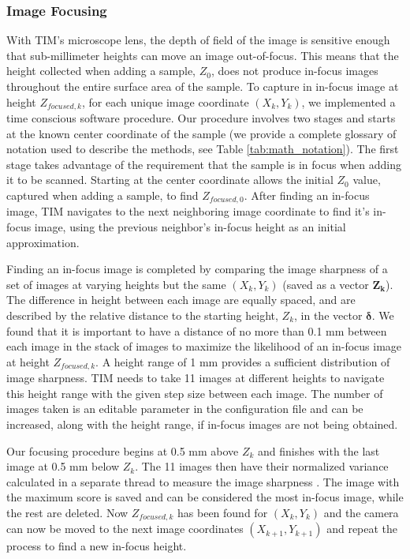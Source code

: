 \documentclass[a4paper,12pt]{article}
\begin{document}
\subsubsection{Image Focusing}

With TIM's microscope lens, the depth of field of the image is sensitive enough that sub-millimeter heights can move an image out-of-focus.
This means that the height collected when adding a sample, $Z_0$, does not produce in-focus images throughout the entire surface area of the sample.
To capture in in-focus image at height $Z_{focused,k}$, for each unique image coordinate $(X_k, Y_k)$, we implemented a time conscious software procedure. 
Our procedure involves two stages and starts at the known center coordinate of the sample (we provide a complete glossary of notation used to describe the methods, see Table \ref{tab:math_notation}).
The first stage takes advantage of the requirement that the sample is in focus when adding it to be scanned.
Starting at the center coordinate allows the initial $Z_0$ value, captured when adding a sample, to find $Z_{focused,0}$. 
After finding an in-focus image, TIM navigates to the next neighboring image coordinate to find it's in-focus image, using the previous neighbor's in-focus height as an initial approximation.

Finding an in-focus image is completed by comparing the image sharpness of a set of images at varying heights but the same $(X_k, Y_k)$ (saved as a vector $\boldsymbol{Z_k}$). 
The difference in height between each image are equally spaced, and are described by the relative distance to the starting height, $Z_k$, in the vector $\boldsymbol{\delta}$. 
We found that it is important to have a distance of no more than 0.1 mm between each image in the stack of images to maximize the likelihood of an in-focus image at height $Z_{focused,k}$.
A height range of 1 mm provides a sufficient distribution of image sharpness. TIM needs to take 11 images at different heights to navigate this height range with the given step size between each image. The number of images taken is an editable parameter in the configuration file and can be increased, along with the height range, if in-focus images are not being obtained.

Our focusing procedure begins at 0.5 mm above $Z_k$ and finishes with the last image at 0.5 mm below $Z_k$.
The 11 images then have their normalized variance calculated in a separate thread to measure the image sharpness \citep{sampat_extensive_2014}.
The image with the maximum score is saved and can be considered the most in-focus image, while the rest are deleted. 
Now $Z_{focused,k}$ has been found for $(X_k, Y_k)$ and the camera can now be moved to the next image coordinates $(X_{k+1}, Y_{k+1})$ and repeat the process to find a new in-focus height.
\end{document}
